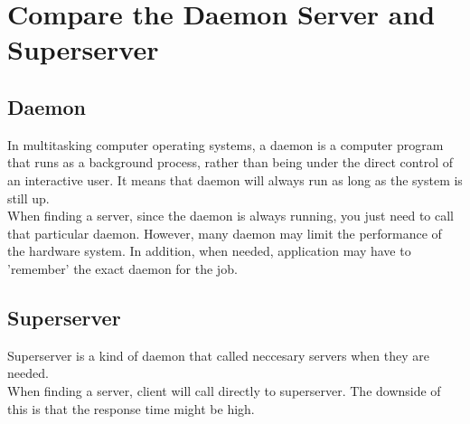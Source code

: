 \documentclass[11pt,a4paper]{article}
\begin{document}
	\section{Compare the Daemon Server and Superserver}
		\subsection{Daemon}
		In multitasking computer operating systems, a daemon is a computer program that runs as a background process, rather than being under the direct control of an interactive user. It means that daemon will always run as long as the system is still up.\\
		When finding a server, since the daemon is always running, you just need to call that particular daemon. However, many daemon may limit the performance of the hardware system. In addition, when needed, application may have to 'remember' the exact daemon for the job.
		\subsection{Superserver}
		Superserver is a kind of daemon that called neccesary servers when they are needed.\\
		When finding a server, client will call directly to superserver. The downside of this is that the response time might be high.
\end{document}
